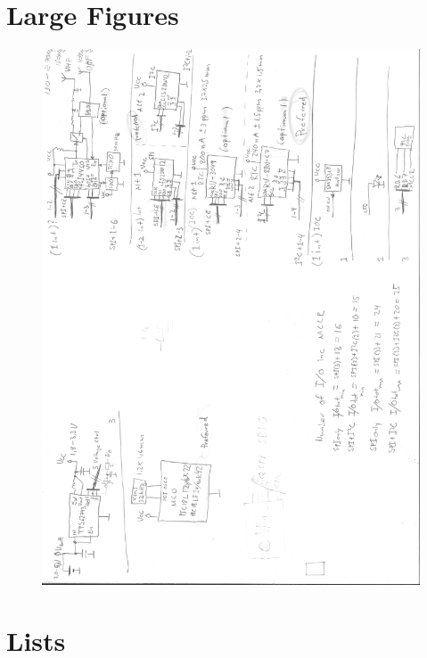 \section{Large Figures}
	\label{sec:app}

\begin{figure}[H] 
	\centering 
	\includegraphics[width=1\linewidth]{Figures/Anders_schema_rot} 
	\label{fig:anders_koppling} 
\end{figure} 

\clearpage
\section{Lists}
